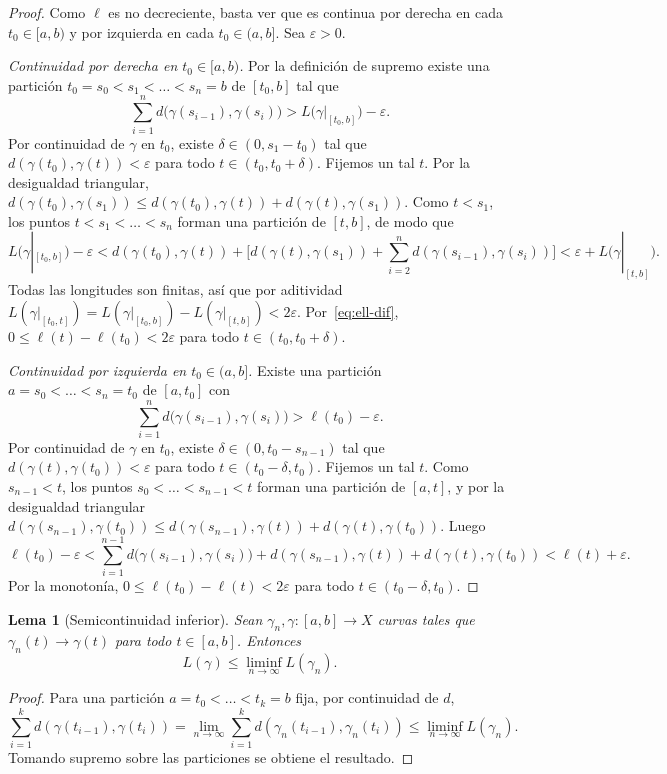 \documentclass[12pt, a4paper]{amsart}
\newtheorem{lema}[teorema]{Lema}
\theoremstyle{definition}
\theoremstyle{remark}
\begin{document}
\begin{proof}
Como $\ell$ es no decreciente, basta ver que es continua por derecha en cada $t_0\in[a,b)$ y por izquierda en cada $t_0\in(a,b]$. Sea $\varepsilon>0$.

\emph{Continuidad por derecha en $t_0\in[a,b)$.} Por la definición de supremo existe una partición $t_0=s_0<s_1<\dots<s_n=b$ de $[t_0,b]$ tal que
\[
\sum_{i=1}^n d\big(\gamma(s_{i-1}),\gamma(s_i)\big)>L\big(\gamma|_{[t_0,b]}\big)-\varepsilon.
\]
Por continuidad de $\gamma$ en $t_0$, existe $\delta\in(0,s_1-t_0)$ tal que $d(\gamma(t_0),\gamma(t))<\varepsilon$ para todo $t\in(t_0,t_0+\delta)$. Fijemos un tal $t$. Por la desigualdad triangular, $d(\gamma(t_0),\gamma(s_1))\le d(\gamma(t_0),\gamma(t))+d(\gamma(t),\gamma(s_1))$. Como $t<s_1$, los puntos $t<s_1<\dots<s_n$ forman una partición de $[t,b]$, de modo que
\[
L\big(\gamma|_{[t_0,b]}\big)-\varepsilon<d(\gamma(t_0),\gamma(t))+\Big[d(\gamma(t),\gamma(s_1))+\sum_{i=2}^n d(\gamma(s_{i-1}),\gamma(s_i))\Big]<\varepsilon+L\big(\gamma|_{[t,b]}\big).
\]
Todas las longitudes son finitas, así que por aditividad $L(\gamma|_{[t_0,t]})=L(\gamma|_{[t_0,b]})-L(\gamma|_{[t,b]})<2\varepsilon$. Por~\eqref{eq:ell-dif}, $0\le\ell(t)-\ell(t_0)<2\varepsilon$ para todo $t\in(t_0,t_0+\delta)$.

\emph{Continuidad por izquierda en $t_0\in(a,b]$.} Existe una partición $a=s_0<\dots<s_n=t_0$ de $[a,t_0]$ con
\[
\sum_{i=1}^n d\big(\gamma(s_{i-1}),\gamma(s_i)\big)>\ell(t_0)-\varepsilon.
\]
Por continuidad de $\gamma$ en $t_0$, existe $\delta\in(0,t_0-s_{n-1})$ tal que $d(\gamma(t),\gamma(t_0))<\varepsilon$ para todo $t\in(t_0-\delta,t_0)$. Fijemos un tal $t$. Como $s_{n-1}<t$, los puntos $s_0<\dots<s_{n-1}<t$ forman una partición de $[a,t]$, y por la desigualdad triangular $d(\gamma(s_{n-1}),\gamma(t_0))\le d(\gamma(s_{n-1}),\gamma(t))+d(\gamma(t),\gamma(t_0))$. Luego
\[
\ell(t_0)-\varepsilon<\sum_{i=1}^{n-1}d\big(\gamma(s_{i-1}),\gamma(s_i)\big)+d(\gamma(s_{n-1}),\gamma(t))+d(\gamma(t),\gamma(t_0))<\ell(t)+\varepsilon.
\]
Por la monotonía, $0\le\ell(t_0)-\ell(t)<2\varepsilon$ para todo $t\in(t_0-\delta,t_0)$.
\end{proof}

\begin{lema}[Semicontinuidad inferior]\label{lem:sci}
Sean $\gamma_n,\gamma\colon[a,b]\to X$ curvas tales que $\gamma_n(t)\to\gamma(t)$ para todo $t\in[a,b]$. Entonces
\[
L(\gamma)\le\liminf_{n\to\infty}L(\gamma_n).
\]
\end{lema}

\begin{proof}
Para una partición $a=t_0<\dots<t_k=b$ fija, por continuidad de $d$,
\[
\sum_{i=1}^k d(\gamma(t_{i-1}),\gamma(t_i)) = \lim_{n\to\infty}\sum_{i=1}^k d(\gamma_n(t_{i-1}),\gamma_n(t_i)) \le \liminf_{n\to\infty} L(\gamma_n).
\]
Tomando supremo sobre las particiones se obtiene el resultado.
\end{proof}
\end{document}
